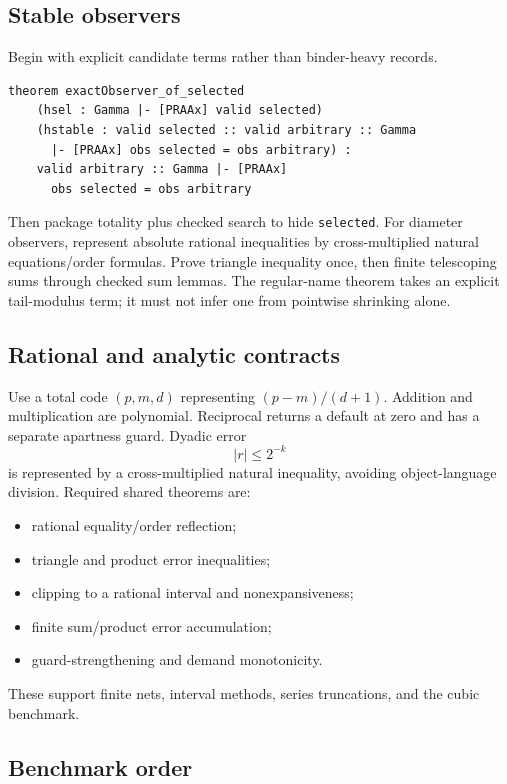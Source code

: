 \subsection{Stable observers}

Begin with explicit candidate terms rather than binder-heavy records.

\begin{lstlisting}
theorem exactObserver_of_selected
    (hsel : Gamma |- [PRAAx] valid selected)
    (hstable : valid selected :: valid arbitrary :: Gamma
      |- [PRAAx] obs selected = obs arbitrary) :
    valid arbitrary :: Gamma |- [PRAAx]
      obs selected = obs arbitrary
\end{lstlisting}
Then package totality plus checked search to hide \texttt{selected}.  For diameter observers, represent absolute rational inequalities by cross-multiplied natural equations/order formulas.  Prove triangle inequality once, then finite telescoping sums through checked sum lemmas.  The regular-name theorem takes an explicit tail-modulus term; it must not infer one from pointwise shrinking alone.

\subsection{Rational and analytic contracts}

Use a total code \((p,m,d)\) representing \((p-m)/(d+1)\).  Addition and multiplication are polynomial.  Reciprocal returns a default at zero and has a separate apartness guard.  Dyadic error
\[
  |r|\le 2^{-k}
\]
is represented by a cross-multiplied natural inequality, avoiding object-language division.  Required shared theorems are:
\begin{itemize}
  \item rational equality/order reflection;
  \item triangle and product error inequalities;
  \item clipping to a rational interval and nonexpansiveness;
  \item finite sum/product error accumulation;
  \item guard-strengthening and demand monotonicity.
\end{itemize}
These support finite nets, interval methods, series truncations, and the cubic benchmark.

\subsection{Benchmark order}

